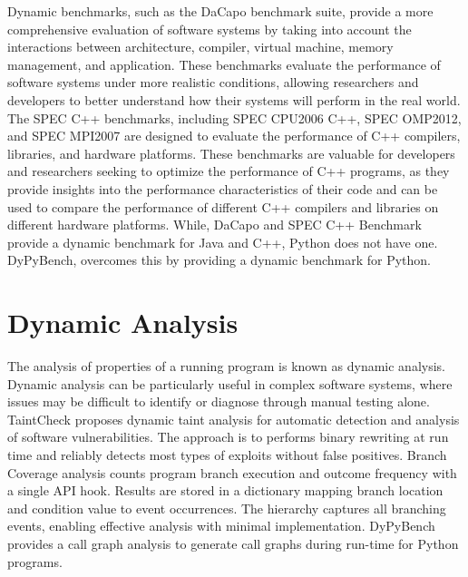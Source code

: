 Dynamic benchmarks, such as the DaCapo benchmark suite, provide a more comprehensive evaluation of software systems by taking into account the interactions between architecture, compiler, virtual machine, memory management, and application. These benchmarks evaluate the performance of software systems under more realistic conditions, allowing researchers and developers to better understand how their systems will perform in the real world. \cite{DaCapo_2006}
The SPEC C++ benchmarks, including SPEC CPU2006 C++, SPEC OMP2012, and SPEC MPI2007 are designed to evaluate the performance of C++ compilers, libraries, and hardware platforms. These benchmarks are valuable for developers and researchers seeking to optimize the performance of C++ programs, as they provide insights into the performance characteristics of their code and can be used to compare the performance of different C++ compilers and libraries on different hardware platforms. \cite{SPEC_C++_2006, SPEC_OMP_2012, SPEC_MPI_2007}
While, DaCapo and SPEC C++ Benchmark provide a dynamic benchmark for Java and C++, Python does not have one. DyPyBench, overcomes this by providing a dynamic benchmark for Python.    

\section{Dynamic Analysis}
The analysis of properties of a running program is known as dynamic analysis.\cite{Ball_1999}
Dynamic analysis can be particularly useful in complex software systems, where issues may be difficult to identify or diagnose through manual testing alone.
\cite{dynamic_analysis}
TaintCheck proposes dynamic taint analysis for automatic detection and analysis of software vulnerabilities. The approach is to performs binary rewriting at run time and reliably detects most types of exploits without false positives.\cite{newsome2005dynamic}
Branch Coverage analysis counts program branch execution and outcome frequency with a single API hook. Results are stored in a dictionary mapping branch location and condition value to event occurrences. The hierarchy captures all branching events, enabling effective analysis with minimal implementation.\cite{DynaPyt2022}
DyPyBench provides a call graph analysis to generate call graphs during run-time for Python programs. 

